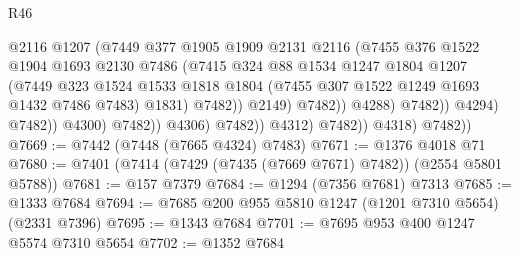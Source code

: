 \begin{lexlean}{R46}
\begin{coremodule}
                                            @2116
                                            @1207
                                            (@7449
                                              @377
                                              @1905
                                              @1909
                                              @2131
                                              @2116
                                              (@7455
                                                @376
                                                @1522
                                                @1904
                                                @1693
                                                @2130
                                                @7486
                                                (@7415
                                                  @324
                                                  @88
                                                  @1534
                                                  @1247
                                                  @1804
                                                  @1207
                                                  (@7449
                                                    @323
                                                    @1524
                                                    @1533
                                                    @1818
                                                    @1804
                                                    (@7455 @307 @1522 @1249 @1693 @1432 @7486 @7483)
                                                    @1831)
                                                  @7482))
                                              @2149)
                                            @7482))
                                        @4288)
                                      @7482))
                                  @4294)
                                @7482))
                            @4300)
                          @7482))
                      @4306)
                    @7482))
                @4312)
              @7482))
          @4318)
        @7482))
@7669 := @7442 (@7448 (@7665 @4324) @7483)
@7671 := @1376 @4018 @71
@7680 := @7401 (@7414 (@7429 (@7435 (@7669 @7671) @7482)) (@2554 @5801 @5788))
@7681 := @157 @7379
@7684 := @1294 (@7356 @7681) @7313
@7685 := @1333 @7684
@7694 := @7685 @200 @955 @5810 @1247 (@1201 @7310 @5654) (@2331 @7396)
@7695 := @1343 @7684
@7701 := @7695 @953 @400 @1247 @5574 @7310 @5654
@7702 := @1352 @7684

\end{coremodule}
\end{lexlean}

